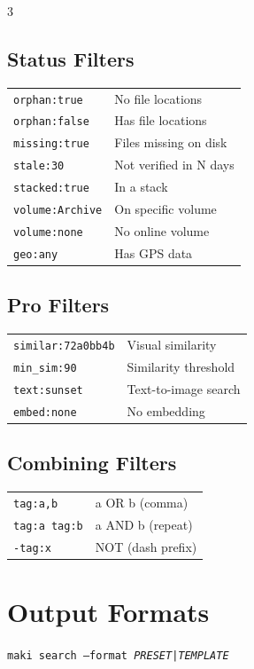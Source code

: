 \documentclass[a4paper,landscape,8pt]{article}
\newcommand{\cmd}[1]{\texttt{\footnotesize #1}}
\begin{document}
\begin{multicols}{3}
\subsection{Status Filters}
\begin{tabularx}{\columnwidth}{@{}lX@{}}
\cmd{orphan:true} & No file locations \\
\cmd{orphan:false} & Has file locations \\
\cmd{missing:true} & Files missing on disk \\
\cmd{stale:30} & Not verified in N days \\
\cmd{stacked:true} & In a stack \\
\cmd{volume:Archive} & On specific volume \\
\cmd{volume:none} & No online volume \\
\cmd{geo:any} & Has GPS data \\
\end{tabularx}

\subsection{Pro Filters}
\begin{tabularx}{\columnwidth}{@{}lX@{}}
\cmd{similar:72a0bb4b} & Visual similarity \\
\cmd{min\_sim:90} & Similarity threshold \\
\cmd{text:sunset} & Text-to-image search \\
\cmd{embed:none} & No embedding \\
\end{tabularx}

\subsection{Combining Filters}
\begin{tabularx}{\columnwidth}{@{}lX@{}}
\cmd{tag:a,b} & a OR b (comma) \\
\cmd{tag:a tag:b} & a AND b (repeat) \\
\cmd{-tag:x} & NOT (dash prefix) \\
\end{tabularx}

\section{Output Formats}

\cmd{maki search --format \textit{PRESET|TEMPLATE}}


\end{multicols}
\end{document}
